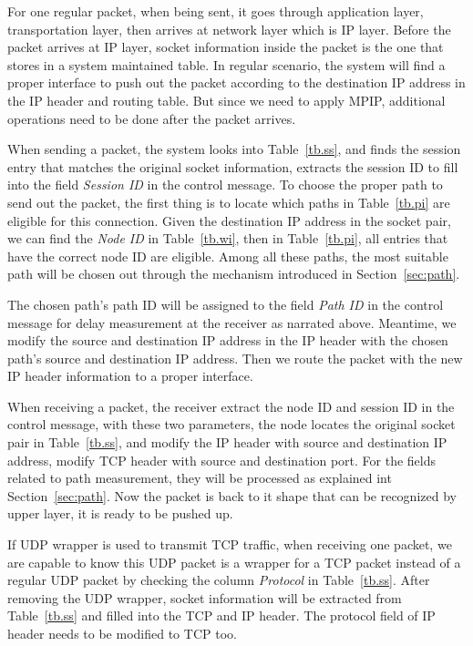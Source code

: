 For one regular packet, when being sent, it goes through application layer, transportation layer, then arrives at network layer which is IP layer. Before the packet arrives at IP layer, socket information inside the packet is the one that stores in a system maintained table. In regular scenario, the system will find a proper interface to push out the packet according to the destination IP address in the IP header and routing table. But since we need to apply MPIP, additional operations need to be done after the packet arrives.

When sending a packet, the system looks into Table~\ref{tb.ss}, and finds the session entry that matches the original socket information, extracts the session ID to fill into the field \emph{Session ID} in the control message. To choose the proper path to send out the packet, the first thing is to locate which paths in Table~\ref{tb.pi} are eligible for this connection. Given the destination IP address in the socket pair, we can find the \emph{Node ID} in Table~\ref{tb.wi}, then in Table~\ref{tb.pi}, all entries that have the correct node ID are eligible. Among all these paths, the most suitable path will be chosen out through the mechanism introduced in Section~\ref{sec:path}. 

The chosen path\textquoteright s path ID will be assigned to the field \emph{Path ID} in the control message for delay measurement at the receiver as narrated above. Meantime, we modify the source and destination IP address in the IP header with the chosen path\textquoteright s source and destination IP address. Then we route the packet with the new IP header information to a proper interface.

When receiving a packet, the receiver extract the node ID and session ID in the control message, with these two parameters, the node locates the original socket pair in Table~\ref{tb.ss}, and modify the IP header with source and destination IP address, modify TCP header with source and destination port. For the fields related to path measurement, they will be processed as explained int Section~\ref{sec:path}. Now the packet is back to it shape that can be recognized by upper layer, it is ready to be pushed up.

If UDP wrapper is used to transmit TCP traffic, when receiving one packet, we are capable to know this UDP packet is a wrapper for a TCP packet instead of a regular UDP packet by checking the column \emph{Protocol} in Table~\ref{tb.ss}. After removing the UDP wrapper, socket information will be extracted from Table~\ref{tb.ss} and filled into the TCP and IP header. The protocol field of IP header needs to be modified to TCP too.

